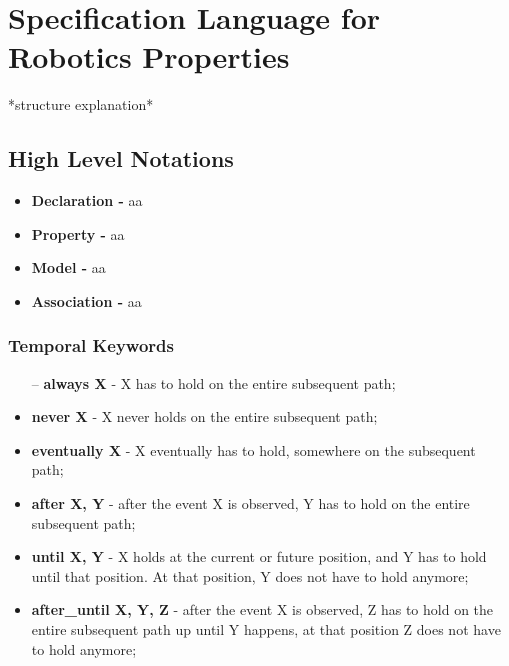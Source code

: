 \chapter{Specification Language for Robotics Properties}
\label{chap:language}

*structure explanation*

\section{High Level Notations}

\begin{itemize}
\item \textbf{Declaration -} aa
\item \textbf{Property -} aa
\item \textbf{Model -} aa
\item \textbf{Association -} aa
\end{itemize}

\subsection{Temporal Keywords}

\begin{itemize}
\item[--] {\bfseries always X} - X has to hold on the entire subsequent path;
\item {\bfseries never X} - X never holds on the entire subsequent path;
\item {\bfseries eventually X} - X eventually has to hold, somewhere on the subsequent path;
\item {\bfseries after X, Y} - after the event X is observed, Y has to hold on the entire subsequent path;
\item {\bfseries until X, Y} - X holds at the current or future position, and Y has to hold until that position. At that position, Y does not have to hold anymore;
\item {\bfseries after\_until X, Y, Z} - after the event X is observed, Z has to hold on the entire subsequent path up until Y happens, at that position Z does not have to hold anymore;
\end{itemize}


